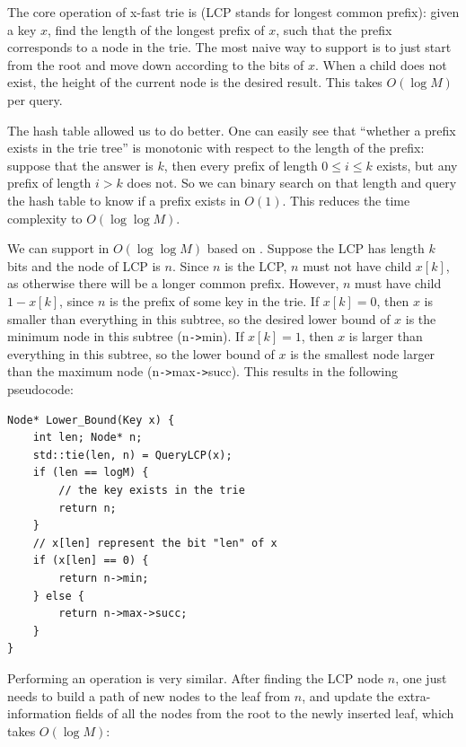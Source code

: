 \documentclass[11pt, usletter]{article}
\begin{document}
The core operation of x-fast trie is \QueryLCP (LCP stands for longest common prefix): 
given a key $x$, find the length of the longest prefix of $x$, 
such that the prefix corresponds to a node in the trie. The most naive way to support \QueryLCP is to just 
start from the root and move down according to the bits of $x$. When a child does not exist, 
the height of the current node is the desired result. This takes $O(\log M)$ per query.

The hash table allowed us to do better. One can easily see that ``whether a prefix exists in the trie tree'' 
is monotonic with respect to the length of the prefix: suppose that the answer is $k$, 
then every prefix of length $0\leq i\leq k$ exists, but any prefix of length $i>k$ does not. 
So we can binary search on that length and query the hash table to know if a prefix exists in $O(1)$. 
This reduces the time complexity to $O(\log\log M)$. 

We can support \lowerbound in $O(\log\log M)$ based on \QueryLCP. 
Suppose the LCP has length $k$ bits and the node of LCP is $n$. 
Since $n$ is the LCP, $n$ must not have child $x[k]$, as otherwise there will be a longer common prefix. 
However, $n$ must have child $1-x[k]$, since $n$ is the prefix of some key in the trie. 
If $x[k]=0$, then $x$ is smaller than everything in this subtree, 
so the desired lower bound of $x$ is the minimum node in this subtree (n\verb|->|min). 
If $x[k]=1$, then $x$ is larger than everything in this subtree, 
so the lower bound of $x$ is the smallest node larger than the maximum node (n\verb|->|max\verb|->|succ). 
This results in the following pseudocode:

\singlespacing\begin{codebox}
\begin{verbatim}
Node* Lower_Bound(Key x) {
    int len; Node* n;
    std::tie(len, n) = QueryLCP(x);
    if (len == logM) {
        // the key exists in the trie
        return n;
    }
    // x[len] represent the bit "len" of x
    if (x[len] == 0) {
        return n->min;
    } else {
        return n->max->succ;
    }
}
\end{verbatim}
\end{codebox}\doublespacing

Performing an \insertion operation is very similar. 
After finding the LCP node $n$, one just needs to build a path of new nodes to the leaf from $n$, 
and update the extra-information fields of all the nodes from the root to the newly inserted leaf,
which takes $O(\log M)$:
\end{document}
